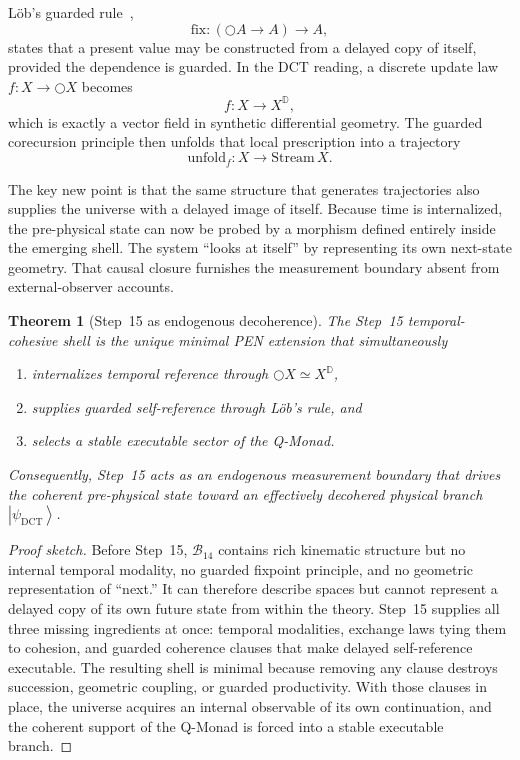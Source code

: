 \documentclass[11pt,a4paper]{article}
\theoremstyle{plain}
\newtheorem{theorem}{Theorem}[section]
\theoremstyle{definition}
\theoremstyle{remark}
\newcommand{\D}{\mathbb{D}}
\newcommand{\B}{\mathcal{B}}
\newcommand{\nextmod}{\bigcirc}
\newcommand{\fix}{\mathrm{fix}}
\newcommand{\Stream}{\mathrm{Stream}}
\newcommand{\unfold}{\mathrm{unfold}}
\providecommand{\ket}[1]{\left|#1\right\rangle}
\begin{document}
L\"ob's guarded rule~\cite{nakano},
\begin{equation}
\label{eq:lob}
    \fix : (\nextmod A \to A) \to A,
\end{equation}
states that a present value may be constructed from a delayed copy of itself, provided the dependence is guarded.
In the DCT reading, a discrete update law $f : X \to \nextmod X$ becomes
\begin{equation}
\label{eq:vf}
    f : X \to X^{\D},
\end{equation}
which is exactly a vector field in synthetic differential geometry.
The guarded corecursion principle then unfolds that local prescription into a trajectory
\begin{equation}
\label{eq:unfold}
    \unfold_f : X \to \Stream\,X.
\end{equation}

The key new point is that the same structure that generates trajectories also supplies the universe with a delayed image of itself.
Because time is internalized, the pre-physical state can now be probed by a morphism defined entirely inside the emerging shell.
The system ``looks at itself'' by representing its own next-state geometry.
That causal closure furnishes the measurement boundary absent from external-observer accounts.

\begin{theorem}[Step~15 as endogenous decoherence]
\label{thm:collapse}
The Step~15 temporal-cohesive shell is the unique minimal PEN extension that simultaneously
\begin{enumerate}[label=(\roman*), nosep]
    \item internalizes temporal reference through $\nextmod X \simeq X^{\D}$,
    \item supplies guarded self-reference through L\"ob's rule, and
    \item selects a stable executable sector of the Q-Monad.
\end{enumerate}
Consequently, Step~15 acts as an endogenous measurement boundary that drives the coherent pre-physical state toward an effectively decohered physical branch $\ket{\psi_{\mathrm{DCT}}}$.
\end{theorem}

\begin{proof}[Proof sketch]
Before Step~15, $\B_{14}$ contains rich kinematic structure but no internal temporal modality, no guarded fixpoint principle, and no geometric representation of ``next.''
It can therefore describe spaces but cannot represent a delayed copy of its own future state from within the theory.
Step~15 supplies all three missing ingredients at once: temporal modalities, exchange laws tying them to cohesion, and guarded coherence clauses that make delayed self-reference executable.
The resulting shell is minimal because removing any clause destroys succession, geometric coupling, or guarded productivity.
With those clauses in place, the universe acquires an internal observable of its own continuation, and the coherent support of the Q-Monad is forced into a stable executable branch.
\end{proof}
\end{document}
